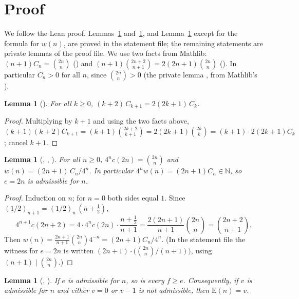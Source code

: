 \documentclass[11pt]{amsart}
\theoremstyle{plain}
\newtheorem{lemma}[theorem]{Lemma}
\theoremstyle{definition}
\newcommand{\N}{\mathbb{N}}
\newcommand{\E}{\mathrm{E}}
\begin{document}
\section{Proof}\label{sec:proof}

We follow the Lean proof. Lemmas~\ref{lem:rec} and~\ref{lem:admissible}, and Lemma~\ref{lem:vietoris} except for the formula for $w(n)$, are proved in the statement file; the remaining statements are private lemmas of the proof file. We use two facts from Mathlib: $(n+1)C_n=\binom{2n}{n}$ () and $(n+1)\binom{2n+2}{n+1}=2(2n+1)\binom{2n}{n}$ (). In particular $C_n>0$ for all $n$, since $\binom{2n}{n}>0$ (the private lemma , from Mathlib's ).

\begin{lemma}[]\label{lem:rec}
For all $k\ge0$, $(k+2)\,C_{k+1}=2(2k+1)\,C_k$.
\end{lemma}

\begin{proof}
Multiplying by $k+1$ and using the two facts above,
$(k+1)(k+2)C_{k+1}=(k+1)\binom{2k+2}{k+1}=2(2k+1)\binom{2k}{k}=(k+1)\cdot2(2k+1)C_k$; cancel $k+1$.
\end{proof}

\begin{lemma}[, , ]\label{lem:vietoris}
For all $n\ge0$, $4^n c(2n)=\binom{2n}{n}$ and $w(n)=(2n+1)\,C_n/4^n$. In particular $4^n w(n)=(2n+1)C_n\in\N$, so $e=2n$ is admissible for $n$.
\end{lemma}

\begin{proof}
Induction on $n$; for $n=0$ both sides equal $1$. Since $(1/2)_{n+1}=(1/2)_n\,(n+\tfrac12)$,
\[
  4^{n+1}c(2n+2)=4\cdot4^n c(2n)\cdot\frac{n+\frac12}{n+1}=\frac{2(2n+1)}{n+1}\binom{2n}{n}=\binom{2n+2}{n+1}.
\]
Then $w(n)=\frac{2n+1}{n+1}\binom{2n}{n}4^{-n}=(2n+1)C_n/4^n$. (In the statement file the witness for $e=2n$ is written $(2n+1)\cdot\bigl(\binom{2n}{n}/(n+1)\bigr)$, using $(n+1)\mid\binom{2n}{n}$.)
\end{proof}

\begin{lemma}[, ]\label{lem:admissible}
If $e$ is admissible for $n$, so is every $f\ge e$. Consequently, if $v$ is admissible for $n$ and either $v=0$ or $v-1$ is not admissible, then $\E(n)=v$.
\end{lemma}
\end{document}
